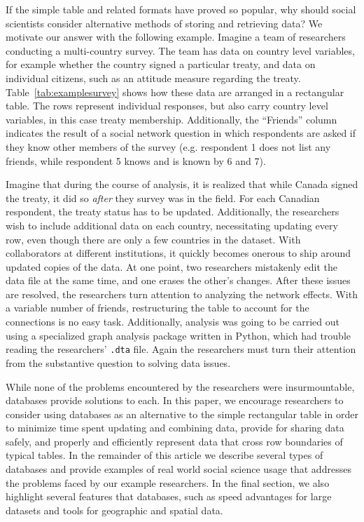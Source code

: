 \documentclass[]{article}
\begin{document}
If the simple table and related formats have proved so popular, why should
social scientists consider alternative methods of storing and retrieving data?
We motivate our answer with the following example. Imagine a team of
researchers
conducting a multi-country survey. The team has data on country level
variables, for example whether the country signed a particular treaty, and
data on individual citizens, such as an attitude measure regarding the treaty.
Table~\ref{tab:examplesurvey} shows how these data are arranged in a
rectangular table. The rows represent individual responses, but also carry
country level variables, in this case treaty membership. Additionally, the
``Friends'' column indicates the result of a social network question in which
respondents are asked if they know other members of the survey (e.g.
respondent 1 does not list any friends, while respondent 5 knows and is known
by 6 and 7).

Imagine that during the course of analysis, it is realized that while Canada
signed the treaty, it did so \emph{after} they survey was in the field. For
each Canadian respondent, the treaty status has to be updated. Additionally,
the researchers wish to include additional data on each country,
necessitating updating every row, even though there are only a few countries in
the dataset. With collaborators at different institutions, it quickly becomes
onerous to ship around updated copies of the data. At one point, two
researchers mistakenly edit the data file at the same time, and one erases the
other's changes. After these issues are resolved, the researchers turn
attention to analyzing the network effects. With a variable number of friends,
restructuring the table to account for the connections is no easy task.
Additionally, analysis was going to be carried out using a specialized graph
analysis package written in Python, which had trouble reading the researchers'
\texttt{.dta} file. Again
the researchers must turn their attention from the substantive question to
solving data issues.

While none of the problems encountered by the researchers were insurmountable,
databases provide solutions to each.  In this paper, we encourage researchers
to consider using databases as an alternative to the simple rectangular table
in order to minimize time spent updating and combining data, provide for
sharing data safely, and properly and efficiently represent data that cross
row boundaries of typical tables.  In the remainder of this article we
describe several types of databases and provide examples of real world social
science usage that addresses the problems faced by our example researchers. In
the final section, we also highlight several features that databases, such as
speed advantages for large datasets and tools for geographic and spatial data. 
\end{document}

